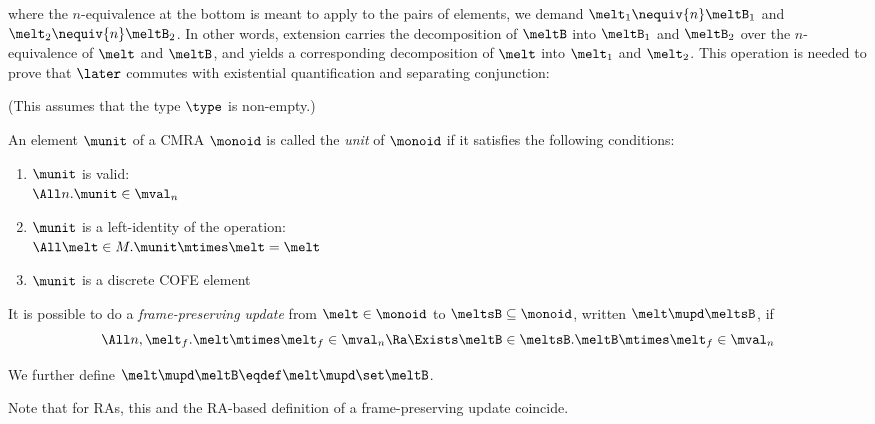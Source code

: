 \begin{center}
\end{center}
where the $n$-equivalence at the bottom is meant to apply to the pairs of elements, \ie we demand $\melt_1 \nequiv{n} \meltB_1$ and $\melt_2 \nequiv{n} \meltB_2$.
In other words, extension carries the decomposition of $\meltB$ into $\meltB_1$ and $\meltB_2$ over the $n$-equivalence of $\melt$ and $\meltB$, and yields a corresponding decomposition of $\melt$ into $\melt_1$ and $\melt_2$.
This operation is needed to prove that $\later$ commutes with existential quantification and separating conjunction:
(This assumes that the type $\type$ is non-empty.)

\begin{defn}
  An element $\munit$ of a CMRA $\monoid$ is called the \emph{unit} of $\monoid$ if it satisfies the following conditions:
  \begin{enumerate}[itemsep=0pt]
  \item $\munit$ is valid: \\ $\All n. \munit \in \mval_n$
  \item $\munit$ is a left-identity of the operation: \\
    $\All \melt \in M. \munit \mtimes \melt = \melt$
  \item $\munit$ is a discrete COFE element
  \end{enumerate}
\end{defn}

\begin{defn}
  It is possible to do a \emph{frame-preserving update} from $\melt \in \monoid$ to $\meltsB \subseteq \monoid$, written $\melt \mupd \meltsB$, if
  \[ \All n, \melt_f. \melt \mtimes \melt_f \in \mval_n \Ra \Exists \meltB \in \meltsB. \meltB \mtimes \melt_f \in \mval_n \]

  We further define $\melt \mupd \meltB \eqdef \melt \mupd \set\meltB$.
\end{defn}
Note that for RAs, this and the RA-based definition of a frame-preserving update coincide.


